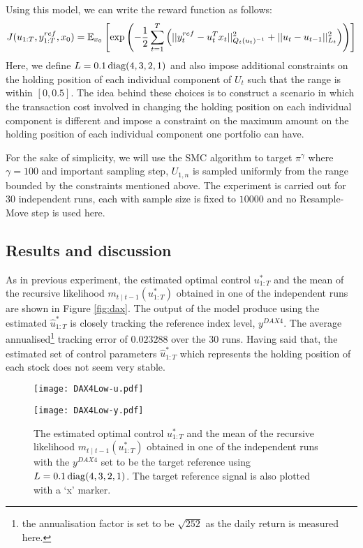 Using this model, we can write the reward function as follows:
\begin{equation}
  J(u_{1:T},y^{ref}_{1:T}, x_0) = \operatorname{\mathbb{E}}_{x_0}\left[ \exp \left( -\dfrac{1}{2}\displaystyle\sum^T_{t=1}\left(\vert\vert y^{ref}_t - u^T_tx_t \vert\vert^2_{Q_t(u_t)^{-1}}  + \vert\vert u_t - u_{t-1} \vert\vert^2_{L_t}\right) \right ) \right]
\end{equation}
Here, we define $L = 0.1\operatorname{diag}(4,3,2,1)$  and also impose additional constraints on the holding position of each individual component of $U_t$ such that the range is within $[0,0.5]$. The idea behind these choices is to construct a scenario in which the transaction cost involved in changing the holding position on each individual component is different and impose a constraint on the maximum amount on the holding position of each individual component one portfolio can have.

For the sake of simplicity, we will use the SMC algorithm to target $\pi^\gamma$ where $\gamma=100$ and important sampling step, $U_{1,n}$ is sampled uniformly from the range bounded by the constraints mentioned above. The experiment is carried out for $30$ independent runs, each with sample size is fixed to $10000$ and no Resample-Move step is used here.

\subsection{Results and discussion}
As in previous experiment, the estimated optimal control $u^*_{1:T}$ and the mean of the recursive likelihood $m_{t \mid t-1}(u^*_{1:T})$ obtained in one of the independent runs are shown in Figure \ref{fig:dax}.  The output of the model produce using the estimated $\hat{u}^*_{1:T}$ is closely tracking the reference index level, $y^{DAX4}$. The average annualised\footnote{the annualisation factor is set to be $\sqrt{252}$ as the daily return is measured here.} tracking error of $0.023288$ over the $30$ runs. Having said that, the estimated set of control parameters $\hat{u}^*_{1:T}$ which represents the holding position of each stock does not seem very stable.

\begin{figure}[tbp]
\centering
    \begin{minipage}{0.5\textwidth}
        \centering
        \texttt{[image: DAX4Low-u.pdf]}
    \end{minipage}%
    \begin{minipage}{0.5\textwidth}
        \centering
        \texttt{[image: DAX4Low-y.pdf]}
    \end{minipage}
\caption{The estimated optimal control $u^*_{1:T}$ and the mean of the recursive likelihood $m_{t \mid t-1}(u^*_{1:T})$ obtained in one of the independent runs with the $y^{DAX4}$ set to be the target reference using $L = 0.1\operatorname{diag}(4,3,2,1)$. The target reference signal is also plotted with a `x' marker.}
\label{fig:dax4}
\end{figure}

